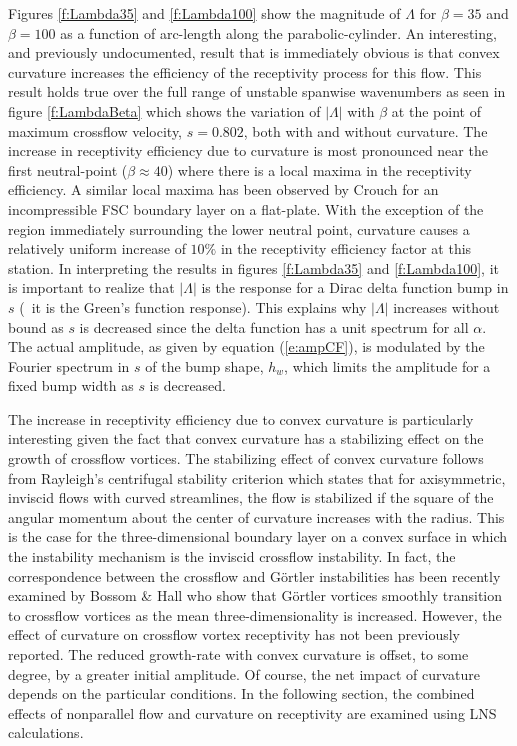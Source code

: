 Figures \ref{f:Lambda35} and \ref{f:Lambda100} show the magnitude of $\Lambda$
for $\beta=35$ and $\beta=100$ as a function of arc-length along the
parabolic-cylinder.  An interesting, and previously undocumented, result that
is immediately obvious is that convex curvature increases the efficiency of
the receptivity process for this flow.  This result holds true over the full
range of unstable spanwise wavenumbers as seen in figure \ref{f:LambdaBeta}
which shows the variation of $|\Lambda|$ with $\beta$ at the point of maximum
crossflow velocity, $s=0.802$, both with and without curvature.  The increase
in receptivity efficiency due to curvature is most pronounced near the first
neutral-point ($\beta \approx 40$) where there is a local maxima in the
receptivity efficiency.  A similar local maxima has been observed by Crouch
\cite{Crouch:93} for an incompressible FSC boundary layer on a flat-plate.
With the exception of the region immediately surrounding the lower neutral
point, curvature causes a relatively uniform increase of $10\%$ in the
receptivity efficiency factor at this station.  In interpreting the results in
figures \ref{f:Lambda35} and \ref{f:Lambda100}, it is important to realize
that $|\Lambda|$ is the response for a Dirac delta function bump in $s$ (\ie\
it is the Green's function response).  This explains why $|\Lambda|$ increases
without bound as $s$ is decreased since the delta function has a unit spectrum
for all $\alpha$.  The actual amplitude, as given by equation (\ref{e:ampCF}),
is modulated by the Fourier spectrum in $s$ of the bump shape, $h_w$, which
limits the amplitude for a fixed bump width as $s$ is decreased.

The increase in receptivity efficiency due to convex curvature is particularly
interesting given the fact that convex curvature has a stabilizing effect on
the growth of crossflow vortices.  The stabilizing effect of convex curvature
follows from Rayleigh's centrifugal stability criterion \cite{DrRe:81} which
states that for axisymmetric, inviscid flows with curved streamlines, the flow
is stabilized if the square of the angular momentum about the center of
curvature increases with the radius.  This is the case for the
three-dimensional boundary layer on a convex surface in which the instability
mechanism is the inviscid crossflow instability.  In fact, the correspondence
between the crossflow and G\"ortler instabilities has been recently examined
by Bossom \& Hall \cite{BaHa:91} who show that G\"ortler vortices smoothly
transition to crossflow vortices as the mean three-dimensionality is
increased.  However, the effect of curvature on crossflow vortex receptivity
has not been previously reported.  The reduced growth-rate with convex
curvature is offset, to some degree, by a greater initial amplitude.  Of
course, the net impact of curvature depends on the particular conditions.  In
the following section, the combined effects of nonparallel flow and curvature
on receptivity are examined using LNS calculations.

